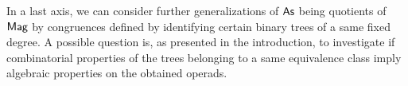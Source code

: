 In a last axis, we can consider further generalizations of $\mathsf{As}$ being
quotients of $\mathsf{Mag}$ by congruences defined by identifying certain binary
trees of a same fixed degree. A possible question is, as presented in
the introduction, to investigate if combinatorial properties of the
trees belonging to a same equivalence class imply algebraic properties
on the obtained operads.
\medbreak
